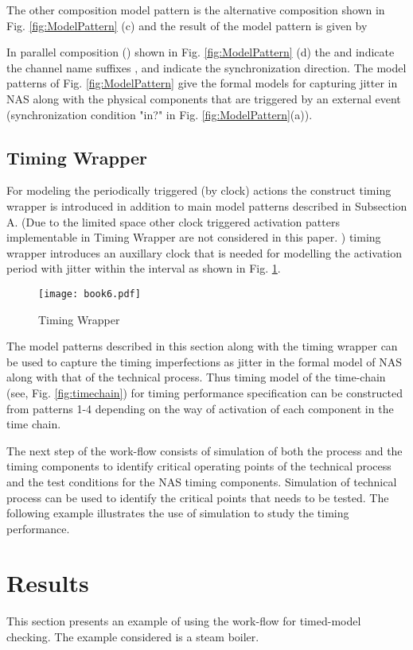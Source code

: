 \documentclass[letterpaper, 10 pt, conference]{ieeeconf}
\begin{document}
The other composition model pattern is the alternative composition shown in Fig. \ref{fig:ModelPattern} (c) and the result of the model pattern is given by


In parallel composition () shown in Fig. \ref{fig:ModelPattern} (d) the  and  indicate the channel name suffixes , and  indicate the  synchronization direction.  The model patterns of Fig. \ref{fig:ModelPattern} give the formal models for capturing jitter in NAS along with the physical components that are triggered by an external event (synchronization condition "in?" in Fig.  \ref{fig:ModelPattern}(a)).


\subsection{Timing Wrapper}
For modeling the periodically triggered (by clock) actions the construct timing wrapper is introduced in addition to main model patterns described in Subsection A.  (Due to the  limited space other clock triggered activation patters  implementable in Timing Wrapper are not considered in this paper. ) timing wrapper introduces an auxillary clock  that is needed for modelling the activation period with jitter within the interval  as shown in Fig. \ref{fig:TimeWrap}.

\begin{figure}[h]
\centering
\texttt{[image: book6.pdf]}
\caption{Timing Wrapper}
\label{fig:TimeWrap}
\end{figure}

The model patterns described in this section along with the timing wrapper can be used to capture the timing imperfections as jitter in the formal model of NAS along with that of the technical process. Thus timing model of the time-chain (see, Fig. \ref{fig:timechain}) for timing performance specification can be constructed from patterns 1-4 depending on the way of activation of each component in the time chain. 

The next step of the work-flow consists of simulation of both the process and the timing components to identify critical operating points of the technical process and the test conditions for the NAS timing components. Simulation of technical process can be used to identify the critical points that needs to be tested. The following example illustrates the use of simulation to study the timing performance.


\section{Results}
This section presents an example of using the work-flow for timed-model checking. The example considered is a steam boiler.
\end{document}
